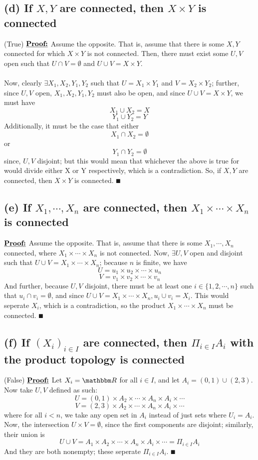\documentclass{article}
\begin{document}
\subsection*{(d) If $X, Y$ are connected, then $X \times Y$ is connected}
(True) $\textbf{\underline{Proof:}}$ Assume the opposite. That is, assume that there is some $X, Y$ connected for which $X \times Y$ is not connected. Then, there must exist some $U, V$ open such that $U \cap V = \emptyset$ and $U \cup V = X \times Y$.  \\ \\
Now, clearly $\exists X_1, X_2, Y_1, Y_2$ such that $U = X_1 \times Y_1$ and $V = X_2 \times Y_2$; further, since $U, V$ open, $X_1, X_2, Y_1, Y_2$ must also be open, and since $U \cup V = X \times Y$, we must have
$$X_1 \cup X_2 = X$$
$$Y_1 \cup Y_2 = Y$$
Additionally, it must be the case that either
$$X_1 \cap X_2 = \emptyset$$
or
$$Y_1 \cap Y_2 = \emptyset$$
since, $U, V$ disjoint; but this would mean that whichever the above is true for would divide either X or Y respectively, which is a contradiction. So, if $X, Y$ are connected, then $X \times Y$ is connected. $\QED$

\subsection*{(e) If $X_1, \cdots , X_n$ are connected, then $X_1 \times \cdots \times X_n$ is connected}
$\textbf{\underline{Proof:}}$ Assume the opposite. That is, assume that there is some $X_1, \cdots , X_n$ connected, where $X_1 \times \cdots \times X_n$ is not connected. Now, $\exists U, V$ open and disjoint such that $U \cup V = X_1 \times \cdots \times X_n$; because $n$ is finite, we have
$$U = u_1 \times u_2 \times \cdots \times u_n$$
$$V = v_1 \times v_2 \times \cdots \times v_n$$
And further, because $U, V$ disjoint, there must be at least one $i \in \{1, 2, \cdots, n\}$ such that $u_i \cap v_i = \emptyset$, and since $U \cup V = X_1 \times \cdots \times X_n, u_i \cup v_i = X_i$. This would seperate $X_i$, which is a contradiction, so the product $X_1 \times \cdots \times X_n$ must be connected. $\QED$

\subsection*{(f) If $(X_i)_{i \in I}$ are connected, then $\Pi_{i \in I}A_i$ with the product topology is connected}
(False) $\textbf{\underline{Proof:}}$ Let $X_i = \R$ for all $i \in I$, and let $A_i = (0, 1) \cup (2, 3)$. Now take $U, V$ defined as such:
$$U = (0, 1) \times A_2 \times \cdots \times A_n \times A_i \times \cdots$$
$$V = (2, 3) \times A_2 \times \cdots \times A_n \times A_i \times \cdots$$
where for all $i < n$, we take any open set in $A_i$ instead of just sets where $U_i = A_i$. Now, the intersection $U \times V = \emptyset$, since the first components are disjoint; similarly, their union is
$$U \cup V = A_1 \times A_2 \times \cdots \times A_n \times A_i \times \cdots = \Pi_{i \in I}A_i$$
And they are both nonempty; these seperate $\Pi_{i \in I}A_i$. $\QED$
\end{document}
